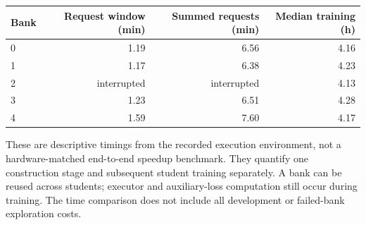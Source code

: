 \begin{center}\small
\begin{tabular}{@{}lrrr@{}}\toprule
Bank & Request window (min) & Summed requests (min) & Median training (h)\\\midrule
0 & 1.19 & 6.56 & 4.16 \\
1 & 1.17 & 6.38 & 4.23 \\
2 & interrupted & interrupted & 4.13 \\
3 & 1.23 & 6.51 & 4.28 \\
4 & 1.59 & 7.60 & 4.17 \\
\bottomrule\end{tabular}\end{center}
These are descriptive timings from the recorded execution environment,
not a hardware-matched end-to-end speedup benchmark. They quantify one
construction stage and subsequent student training separately. A bank can
be reused across students; executor and auxiliary-loss computation still
occur during training. The time comparison does not include all development
or failed-bank exploration costs.
